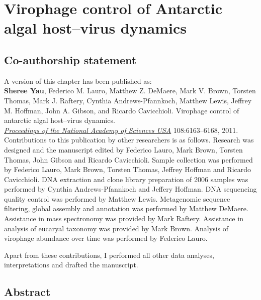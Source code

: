 \chapter{Virophage control of Antarctic algal host--virus dynamics}
\label{ch:olv}
\acresetall

\section*{Co-authorship statement}

A version of this chapter has been published as:\\

\textbf{Sheree Yau}, Federico M. Lauro, Matthew Z. DeMaere, Mark V. Brown, Torsten Thomas,
Mark J. Raftery, Cynthia Andrews-Pfannkoch, Matthew Lewis, Jeffrey M. Hoffman, John A. Gibson, and
Ricardo Cavicchioli.
Virophage control of antarctic algal host--virus dynamics.\\
\emph{\underline{Proceedings of the National Academy of Sciences USA}}
108:6163--6168, 2011.\\

Contributions to this publication by other researchers is as follows.
Research was designed and the manuscript edited by Federico Lauro, Mark Brown, Torsten Thomas, John Gibson and Ricardo Cavicchioli.
Sample collection was performed by Federico Lauro, Mark Brown, Torsten Thomas, Jeffrey Hoffman and Ricardo Cavicchioli.
\textsc{DNA} extraction and clone library preparation of 2006 samples was performed by Cynthia Andrews-Pfannkoch and Jeffery Hoffman.
\textsc{DNA} sequencing quality control was performed by Matthew Lewis.
Metagenomic sequence filtering, global assembly and annotation was performed by Matthew DeMaere.
Assistance in mass spectronomy was provided by Mark Raftery.
Assistance in analysis of eucaryal taxonomy was provided by Mark Brown.
Analysis of virophage abundance over time was performed by Federico Lauro.

Apart from these contributions, I performed all other data analyses, interpretations and drafted the manuscript.
\newpage


\section{Abstract}

